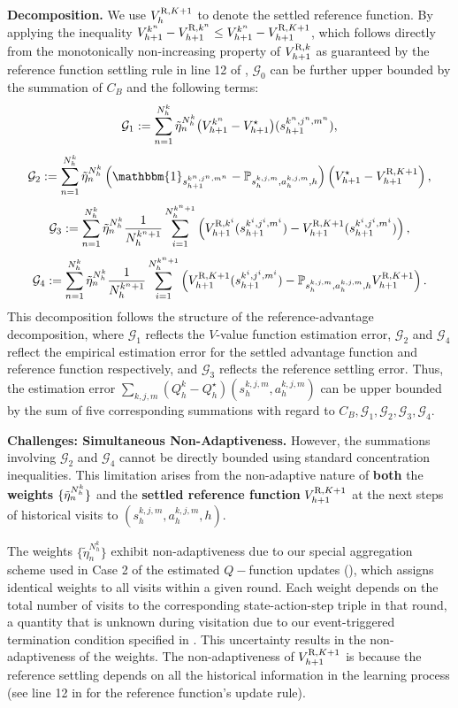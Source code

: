 \documentclass{article}
\newcommand{\R}{\textnormal{R}}
\begin{document}
\textbf{Decomposition.} We use $V_{h}^{\R,K+1}$ to denote the settled reference function. By applying the inequality $V_{h+1}^{k^n}-V_{h+1}^{\R,k^n}\leq V_{h+1}^{k^n}-V_{h+1}^{\R,K+1}$, which follows directly from the monotonically non-increasing property of $V_{h+1}^{\R,k}$ as guaranteed by the reference function settling rule in line 12 of , $\mathcal{G}_0$ can be further upper bounded by the summation of $C_B$ and the following terms:
$$\mathcal{G}_1 := \sum_{n=1}^{N_h^k} \Tilde{\eta}_n^{N_h^k} \big(V_{h+1}^{k^n}-V_{h+1}^{\star}\big)(s_{h+1}^{k^n,j^n,m^n}),$$
$$\mathcal{G}_2 := \sum_{n=1}^{N_h^k} \Tilde{\eta}_n^{N_h^k}\left(\mathbbm{1}_{s_{h+1}^{k^n,j^n,m^n}}-\mathbb{P}_{s_h^{k,j,m}, a_h^{k,j,m},h}\right)\left(V_{h+1}^{\star}-V_{h+1}^{\R,K+1}\right),$$
$$\mathcal{G}_3 := \sum_{n=1}^{N_h^k} \Tilde{\eta}_n^{N_h^k}\frac{1}{N_h^{k^n+1}} \sum_{i=1}^{N_h^{k^n+1}}\left(V_{h+1}^{\R,k^i}(s_{h+1}^{k^i,j^i,m^i})-V_{h+1}^{\R,K+1}(s_{h+1}^{k^i,j^i,m^i})\right),$$
$$\mathcal{G}_4 := \sum_{n=1}^{N_h^k} \Tilde{\eta}_n^{N_h^k}\frac{1}{N_h^{k^n+1}} \sum_{i=1}^{N_h^{k^n+1}}\left(V_{h+1}^{\R,K+1}(s_{h+1}^{k^i,j^i,m^i})-\mathbb{P}_{s_h^{k,j,m}, a_h^{k,j,m},h}V_{h+1}^{\R,K+1}\right).$$
This decomposition follows the structure of the reference-advantage decomposition, where $\mathcal{G}_1$ reflects the $V$-value function estimation error, $\mathcal{G}_2$ and $\mathcal{G}_4$ reflect the empirical estimation error for the settled advantage function and reference function respectively, and $\mathcal{G}_3$ reflects the reference settling error. Thus, the estimation error $\sum_{k,j,m}(Q_h^k-Q_h^\star)(s_h^{k,j,m},a_h^{k,j,m})$ can be upper bounded by the sum of five corresponding summations with regard to $C_B,\mathcal{G}_1,\mathcal{G}_2,\mathcal{G}_3,\mathcal{G}_4$. 

\textbf{Challenges: Simultaneous Non-Adaptiveness.} However, the summations involving $\mathcal{G}_2$ and $\mathcal{G}_4$ cannot be directly bounded using standard concentration inequalities.
This limitation arises from the non-adaptive nature of \textbf{both} the \textbf{weights} $\{\Tilde{\eta}_n^{N_h^k}\}$ and the \textbf{settled reference function} $V_{h+1}^{\R,K+1}$ at the next steps of historical visits to $(s_h^{k,j,m},a_h^{k,j,m},h)$. 

The weights $\{\tilde{\eta}_n^{N_h^k}\}$ exhibit non-adaptiveness due to our special aggregation scheme used in Case 2 of the estimated $Q-$function updates (), which assigns identical weights to all visits within a given round. Each weight depends on the total number of visits to the corresponding state-action-step triple in that round, a quantity that is unknown during visitation due to our event-triggered termination condition specified in . This uncertainty results in the non-adaptiveness of the weights. The non-adaptiveness of $V_{h+1}^{\R,K+1}$ is because the reference settling depends on all the historical information in the learning process (see line 12 in  for the reference function's update rule).
\end{document}

